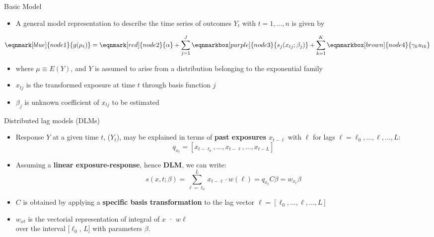 \documentclass[english]{beamer}
\newcommand{\alertblue}[1]{{\color{blue}#1}}
\begin{document}
\begin{frame}{Basic Model}
\begin{itemize}
    \item A general model representation to describe the \alertblue{time series of outcomes \( Y_t \)} with \alertblue{\( t = 1, \dots, n \)} is given by
\end{itemize}
\vspace{0.8cm}
\begin{equation*}
    \eqnmark[blue]{node1}{g(\mu_t)} =
    \eqnmark[red]{node2}{\alpha} +
    \sum_{j=1}^{J} \eqnmarkbox[purple]{node3}{s_j(x_{tj}; \beta_j)} +
    \sum_{k=1}^{K} \eqnmarkbox[brown]{node4}{\gamma_k u_{tk}}
\end{equation*}
\vspace{0.5cm}
\begin{itemize}
    \item where \alertblue{\( \mu \equiv E(Y) \)}, and \( Y \) is assumed to arise from a distribution belonging to the exponential family  
    \item \alertblue{\(x_{tj}\)} is the transformed exposure at time \alertblue{\(t\)} through basis function \alertblue{\(j\)}
    \item \alertblue{\(\beta_j\)} is unknown coefficient of \alertblue{\(x_{tj}\)} to be estimated
\end{itemize}
\end{frame}
\begin{frame}{Distributed lag models (DLMs)}
\begin{itemize}
    \item Response \alertblue{\(Y\)} at a given time \alertblue{\(t\)}, (\alertblue{\(Y_t\)}),  may be explained in terms of \textbf{\alertblue{past exposures \( x_{t-\ell} \)}} with \(\ell\) for lags \( \ell = \ell_0, \ldots, \ell, \ldots, L \):
    \[q_{x_t} = [x_{t - \ell_0}, \ldots, x_{t - \ell}, \ldots, x_{t - L}]\]

    \item Assuming a \textbf{\alertblue{linear exposure-response}}, hence \textbf{\alertblue{DLM}}, we can write:
    \[s(x,t; \beta) =\sum_{\ell = \ell_0}^{L} x_{t-\ell} \cdot w( \ell)
        = q_{x_t} C \beta = w_{x_t} \beta\] 

    \item \textbf{\alertblue{\( C \)}} is obtained by applying a \textbf{\alertblue{specific basis transformation}} to the lag vector \( \ell = [\ell_0, \ldots, \ell, \ldots, L] \) 
    \item \alertblue{\(w_{xt}\)} is the vectorial representation of
   integral of \alertblue{\(x\) · \(w\ell\)} \\
   over the interval [\(\ell_0\), \(L\)] with parameters \(\beta\).
\end{itemize}
\end{frame}
\end{document}
